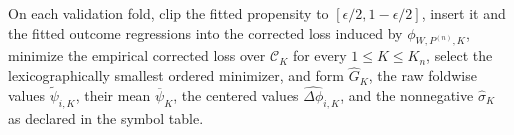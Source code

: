 On each validation fold, clip the fitted propensity to \([\epsilon/2,1-\epsilon/2]\), insert it and the fitted outcome regressions into the corrected loss induced by \(\phi_{W,P^{(n)},K}\), minimize the empirical corrected loss over \(\mathcal C_K\) for every \(1\le K\le K_n\), select the lexicographically smallest ordered minimizer, and form \(\widehat G_K\), the raw foldwise values \(\widetilde\psi_{i,K}\), their mean \(\overline\psi_K\), the centered values \(\widehat{\Delta\phi}_{i,K}\), and the nonnegative \(\widehat\sigma_K\) as declared in the symbol table.
